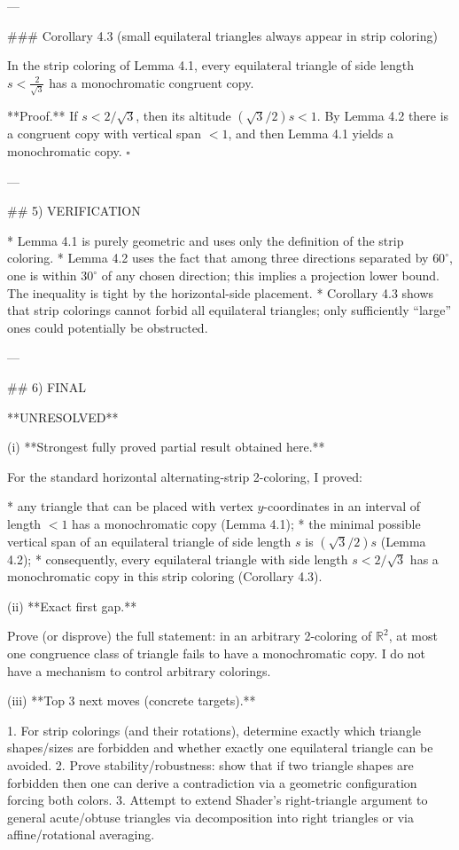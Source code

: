---

### Corollary 4.3 (small equilateral triangles always appear in strip coloring)

In the strip coloring of Lemma 4.1, every equilateral triangle of side length $s<\frac{2}{\sqrt3}$ has a monochromatic congruent copy.

**Proof.**
If $s<2/\sqrt3$, then its altitude $(\sqrt3/2)s<1$.
By Lemma 4.2 there is a congruent copy with vertical span $<1$, and then Lemma 4.1 yields a monochromatic copy.
$\square$

---

## 5) VERIFICATION

* Lemma 4.1 is purely geometric and uses only the definition of the strip coloring.
* Lemma 4.2 uses the fact that among three directions separated by $60^\circ$, one is within $30^\circ$ of any chosen direction; this implies a projection lower bound. The inequality is tight by the horizontal-side placement.
* Corollary 4.3 shows that strip colorings cannot forbid all equilateral triangles; only sufficiently “large” ones could potentially be obstructed.

---

## 6) FINAL

**UNRESOLVED**

(i) **Strongest fully proved partial result obtained here.**

For the standard horizontal alternating-strip 2-coloring, I proved:

* any triangle that can be placed with vertex $y$-coordinates in an interval of length $<1$ has a monochromatic copy (Lemma 4.1);
* the minimal possible vertical span of an equilateral triangle of side length $s$ is $(\sqrt3/2)s$ (Lemma 4.2);
* consequently, every equilateral triangle with side length $s<2/\sqrt3$ has a monochromatic copy in this strip coloring (Corollary 4.3).

(ii) **Exact first gap.**

Prove (or disprove) the full statement: in an arbitrary 2-coloring of $\mathbb R^2$, at most one congruence class of triangle fails to have a monochromatic copy. I do not have a mechanism to control arbitrary colorings.

(iii) **Top 3 next moves (concrete targets).**

1. For strip colorings (and their rotations), determine exactly which triangle shapes/sizes are forbidden and whether exactly one equilateral triangle can be avoided.
2. Prove stability/robustness: show that if two triangle shapes are forbidden then one can derive a contradiction via a geometric configuration forcing both colors.
3. Attempt to extend Shader’s right-triangle argument to general acute/obtuse triangles via decomposition into right triangles or via affine/rotational averaging.

